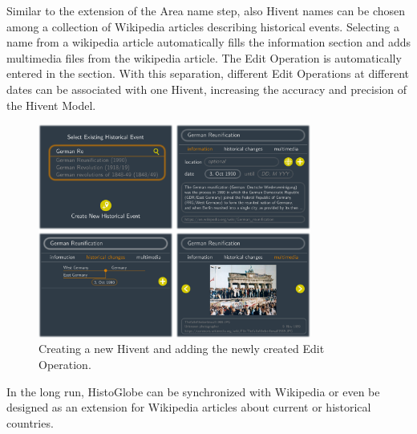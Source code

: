 Similar to the extension of the Area name step, also Hivent names can be chosen among a collection of Wikipedia articles describing historical events. Selecting a name from a wikipedia article automatically fills the information section and adds multimedia files from the wikipedia article. The Edit Operation is automatically entered in the section. With this separation, different Edit Operations at different dates can be associated with one Hivent, increasing the accuracy and precision of the Hivent Model.

\begin{figure}[ht]
  \centering
  \includegraphics[width = 0.8\textwidth]{graphics/extensions/new_hivent_box}
  \caption{Creating a new Hivent and adding the newly created Edit Operation.}
  \label{fig:uncertainty_new_hivent_box}
\end{figure}

In the long run, HistoGlobe can be synchronized with Wikipedia or even be designed as an extension for Wikipedia articles about current or historical countries.




